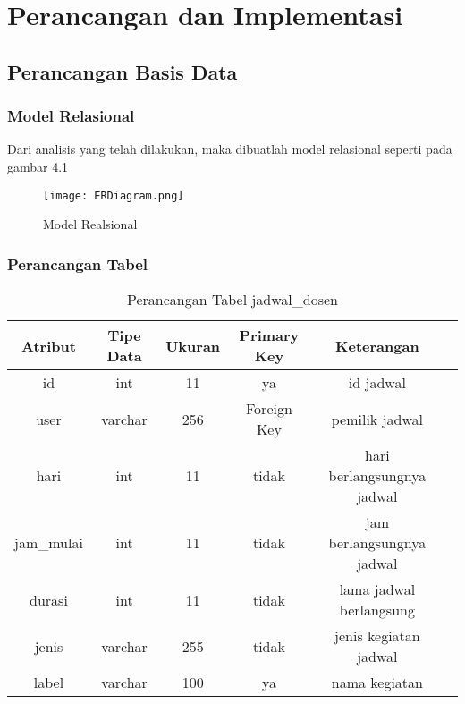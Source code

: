\chapter{Perancangan dan Implementasi}
\label{chap:perancanganDanImplementasi}
\setcounter{secnumdepth}{3}

\paragraph{}
\section{Perancangan Basis Data}
\subsection{Model Relasional}
Dari analisis yang telah dilakukan, maka dibuatlah model relasional seperti pada gambar 4.1

\begin{figure} [H]
	\centering  
	\texttt{[image: ERDiagram.png]}  
	\caption[Model Realsional]{Model Realsional} 
	\label{fig:skematik-phpexcel} 
\end{figure}

\subsection{Perancangan Tabel}
\begin{center}
	\begin{table}[H]
	\begin{tabular}{|c|c|c|c|c|c|}
 			\hline
		\textbf{Atribut} & \textbf{Tipe Data} & \textbf{Ukuran} & \textbf{Primary Key}  & \textbf{Keterangan} \\
			\hline
		 id & int & 11 & ya &  id jadwal\\
			 \hline
			 user & varchar & 256 & Foreign Key &   pemilik jadwal\\
			 \hline
			 hari & int & 11 & tidak &   hari berlangsungnya jadwal\\
			 \hline
			 jam\_mulai & int & 11 & tidak &  jam berlangsungnya jadwal\\
			 \hline
			 durasi & int & 11 & tidak &  lama jadwal berlangsung\\
			 \hline
			 jenis & varchar & 255 & tidak &  jenis kegiatan jadwal\\
			 \hline
			 label & varchar & 100 & ya &   nama kegiatan\\
			 \hline
	\end{tabular}
	\caption{Perancangan Tabel jadwal\_dosen}
	\end{table}
\end{center}

